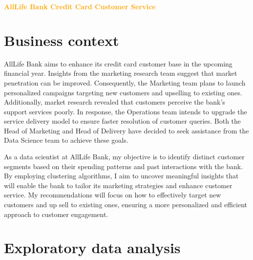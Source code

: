 \documentclass[10pt,a4paper]{style}
\begin{document}
	\tableofcontents
	\listoffigures
	\newpage
	\begin{center}
		\textcolor{orange}{\Large {\bf{AllLife Bank Credit Card Customer Service}}}
	\end{center}
	
	\section{Business context}
		AllLife Bank aims to enhance its credit card customer base in the upcoming financial year. Insights from the marketing research team suggest that market penetration can be improved. Consequently, the Marketing team plans to launch personalized campaigns targeting new customers and upselling to existing ones. Additionally, market research revealed that customers perceive the bank's support services poorly. In response, the Operations team intends to upgrade the service delivery model to ensure faster resolution of customer queries. Both the Head of Marketing and Head of Delivery have decided to seek assistance from the Data Science team to achieve these goals.
		
		As a data scientist at AllLife Bank, my objective is to identify distinct customer segments based on their spending patterns and past interactions with the bank. By employing clustering algorithms, I aim to uncover meaningful insights that will enable the bank to tailor its marketing strategies and enhance customer service. My recommendations will focus on how to effectively target new customers and up sell to existing ones, ensuring a more personalized and efficient approach to customer engagement.
	
	\section{Exploratory data analysis}
\end{document}

